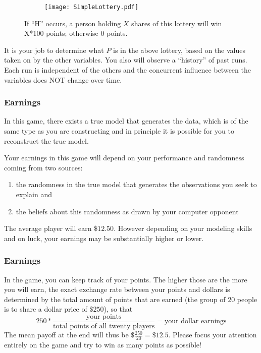 \documentclass{beamer}
\begin{document}
\begin{frame}
\begin{figure}
        \centering
        \begin{subfigure}[b]{0.5\textwidth}
                \texttt{[image: SimpleLottery.pdf]}
                
        \end{subfigure}%
       \caption{If ``H'' occurs, a person holding $X$ shares of this lottery will win X*100 points; otherwise 0 points.}
       \label{fig:alarm}
\end{figure}
It is your job to determine what $P$ is in the above lottery, based on the values taken on by the other variables.  You also will observe a ``history'' of past runs. Each run is independent of the others and the concurrent influence between the variables does NOT change over time. 
\hfill \break
\end{frame}

\begin{frame}
\frametitle{Earnings}
In this game, there exists a true model that generates the data, which is of the same type as you are constructing and in principle it is possible for you to reconstruct the true model. 

Your earnings in this game will depend on your performance and randomness coming from two sources: 
\begin{enumerate}
\item the randomness in the true model that generates the observations you seek to explain and
\item the beliefs about this randomness as drawn by your computer opponent 
\end{enumerate}
The average player will earn $\$12.50$. However depending on your modeling skills and on luck, your earnings may be substantially higher or lower. 
\end{frame}
\begin{frame}
\frametitle{Earnings}
In the game, you can keep track of your points. The higher those are the more you will earn, the exact exchange rate between your points and dollars is determined by the total amount of points that are earned (the group of 20 people is to share a dollar price of $\$250$), so that
\begin{equation}
 250 * \frac{\mbox{your points}}{\mbox{total points of all twenty players}} = \mbox{your dollar earnings}
\end{equation}
The mean payoff at the end will thus be $\$ \frac{250}{20}= \$12.5$. Please focus your attention entirely on the game and try to win as many points as possible!
\end{frame}
\end{document}
